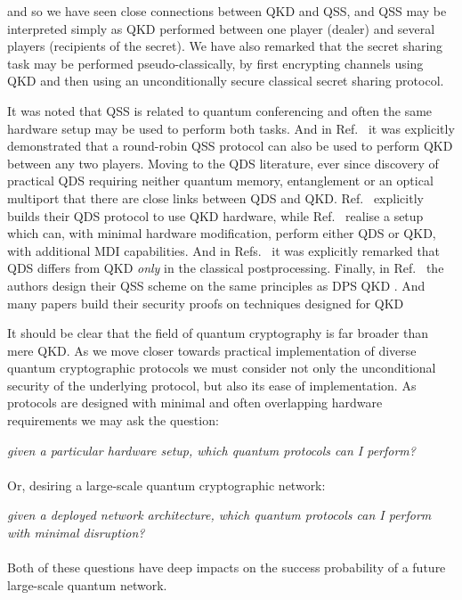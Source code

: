 
and so we have seen close connections between QKD and QSS, and QSS may be interpreted simply as QKD performed between one player (dealer) and several players (recipients of the secret). We have also remarked that the secret sharing task may be performed pseudo-classically, by first encrypting channels using QKD and then using an unconditionally secure classical secret sharing protocol. 

It was noted  that QSS is related to quantum conferencing and often the same hardware setup may be used to perform both tasks. And in Ref.~ it was explicitly demonstrated that a round-robin QSS protocol can also be used to perform QKD between any two players. Moving to the QDS literature, ever since discovery of practical QDS requiring neither quantum memory, entanglement or an optical multiport that there are close links between QDS and QKD. Ref.~ explicitly builds their QDS protocol to use QKD hardware, while Ref.~ realise a setup which can, with minimal hardware modification, perform either QDS or QKD, with additional MDI capabilities. And in Refs.~ it was explicitly remarked that QDS differs from QKD \emph{only} in the classical postprocessing. Finally, in Ref.~ the authors design their QSS scheme on the same principles as DPS QKD . And many papers build their security proofs on techniques designed for QKD 


It should be clear that the field of quantum cryptography is far broader than mere QKD. As we move closer towards practical implementation of diverse quantum cryptographic protocols we must consider not only the unconditional security of the underlying protocol, but also its ease of implementation. As protocols are designed with minimal and often overlapping hardware requirements we may ask the question:
\\
\par
\emph{given a particular hardware setup, which quantum protocols can I perform?}
\\
\\
\noindent Or, desiring a large-scale quantum cryptographic network:
\\
\par
\emph{given a deployed network architecture, which quantum protocols can I perform with minimal disruption?}
\\
\\
\noindent Both of these questions have deep impacts on the success probability of a future large-scale quantum network. 

